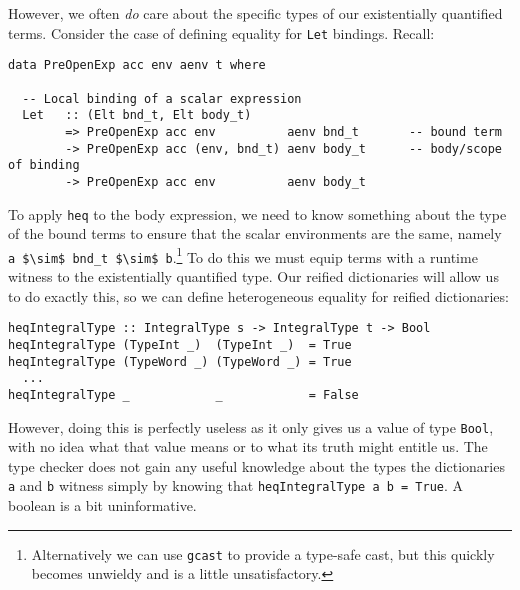 However, we often \emph{do} care about the specific types of our existentially
quantified terms. Consider the case of defining equality for \texttt{Let}
bindings. Recall:
%
\begin{lstlisting}[style=haskell]
data PreOpenExp acc env aenv t where

  -- Local binding of a scalar expression
  Let   :: (Elt bnd_t, Elt body_t)
        => PreOpenExp acc env          aenv bnd_t       -- bound term
        -> PreOpenExp acc (env, bnd_t) aenv body_t      -- body/scope of binding
        -> PreOpenExp acc env          aenv body_t
\end{lstlisting}
%
To apply \texttt{heq} to the body expression, we need to know something about
the type of the bound terms to ensure that the scalar environments are the same,
namely \lstinline[mathescape]{a $\sim$ bnd_t $\sim$ b}.\footnote{Alternatively
we can use \texttt{gcast} to provide a type-safe cast, but this quickly
becomes unwieldy and is a little unsatisfactory.} To do this we must equip terms
with a runtime witness to the existentially quantified type. Our reified
dictionaries will allow us to do exactly this, so we can define heterogeneous
equality for reified dictionaries:
%
\begin{lstlisting}[style=haskell]
heqIntegralType :: IntegralType s -> IntegralType t -> Bool
heqIntegralType (TypeInt _)  (TypeInt _)  = True
heqIntegralType (TypeWord _) (TypeWord _) = True
  ...
heqIntegralType _            _            = False
\end{lstlisting}
%
However, doing this is perfectly useless as it only gives us a value of type
\texttt{Bool}, with no idea what that value means or to what its truth might
entitle us. The type checker does not gain any useful knowledge about the types
the dictionaries \texttt{a} and \texttt{b} witness simply by knowing that
\lstinline{heqIntegralType a b = True}. A boolean is a bit uninformative.

